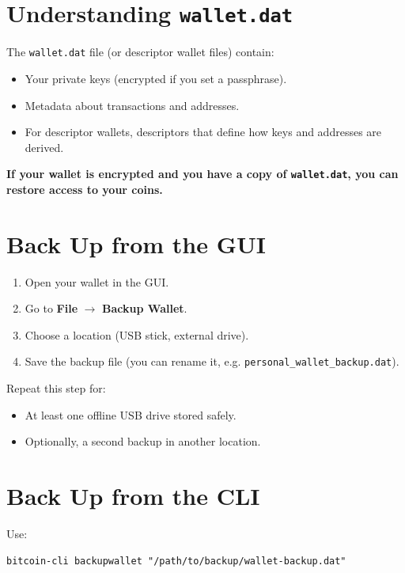 \documentclass[12pt,a4paper]{book}
\begin{document}
\section{Understanding \texttt{wallet.dat}}

The \texttt{wallet.dat} file (or descriptor wallet files) contain:

\begin{itemize}
  \item Your private keys (encrypted if you set a passphrase).
  \item Metadata about transactions and addresses.
  \item For descriptor wallets, descriptors that define how keys and addresses are derived.
\end{itemize}

\textbf{If your wallet is encrypted and you have a copy of \texttt{wallet.dat}, you can restore access to your coins.}

\section{Back Up from the GUI}

\begin{enumerate}
  \item Open your wallet in the GUI.
  \item Go to \textbf{File} $\rightarrow$ \textbf{Backup Wallet}.
  \item Choose a location (USB stick, external drive).
  \item Save the backup file (you can rename it, e.g. \texttt{personal\_wallet\_backup.dat}).
\end{enumerate}

Repeat this step for:
\begin{itemize}
  \item At least one offline USB drive stored safely.
  \item Optionally, a second backup in another location.
\end{itemize}

\section{Back Up from the CLI}

Use:

\begin{lstlisting}[style=bashstyle]
bitcoin-cli backupwallet "/path/to/backup/wallet-backup.dat"
\end{lstlisting}
\end{document}
